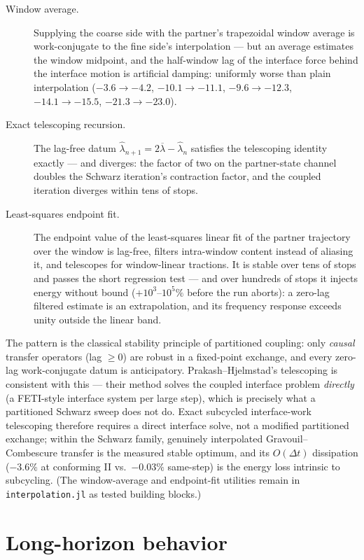 \documentclass[11pt]{article}
\newcommand{\code}[1]{\texttt{#1}}
\begin{document}
\begin{description}
  \item[Window average.] Supplying the coarse side with the partner's trapezoidal
  window average is work-conjugate to the fine side's interpolation --- but
  an average estimates the window midpoint, and the half-window lag of the
  interface force behind the interface motion is artificial damping:
  uniformly worse than plain interpolation ($-3.6 \to -4.2$,
  $-10.1 \to -11.1$, $-9.6 \to -12.3$, $-14.1 \to -15.5$,
  $-21.3 \to -23.0$).
  \item[Exact telescoping recursion.] The lag-free datum
  $\hat\lambda_{n+1} = 2\overline{\lambda} - \hat\lambda_n$ satisfies the
  telescoping identity exactly --- and diverges: the factor of two on the
  partner-state channel doubles the Schwarz iteration's contraction factor,
  and the coupled iteration diverges within tens of stops.
  \item[Least-squares endpoint fit.] The endpoint value of the
  least-squares linear fit of the partner trajectory over the window is
  lag-free, filters intra-window content instead of aliasing it, and
  telescopes for window-linear tractions. It is stable over tens of stops
  and passes the short regression test --- and over hundreds of stops it
  injects energy without bound ($+10^3$--$10^5\%$ before the run aborts): a
  zero-lag filtered estimate is an extrapolation, and its frequency
  response exceeds unity outside the linear band.
\end{description}

The pattern is the classical stability principle of partitioned coupling:
only \emph{causal} transfer operators (lag $\ge 0$) are robust in a
fixed-point exchange, and every zero-lag work-conjugate datum is
anticipatory. Prakash--Hjelmstad's telescoping is consistent with this ---
their method solves the coupled interface problem \emph{directly} (a
FETI-style interface system per large step), which is precisely what a
partitioned Schwarz sweep does not do. Exact subcycled interface-work
telescoping therefore requires a direct interface solve, not a modified
partitioned exchange; within the Schwarz family, genuinely interpolated
Gravouil--Combescure transfer is the measured stable optimum, and its
$O(\Delta t)$ dissipation ($-3.6\%$ at conforming II vs.\ $-0.03\%$
same-step) is the energy loss intrinsic to subcycling. (The window-average and
endpoint-fit utilities remain in \code{interpolation.jl} as tested
building blocks.)

\section{Long-horizon behavior}
\label{sec:tenms}
\end{document}
